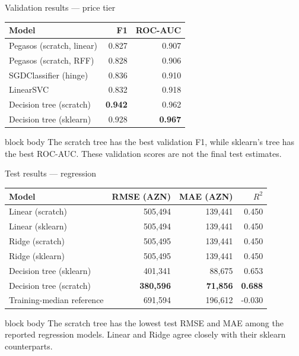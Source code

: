 \documentclass[aspectratio=169,10pt]{beamer}
\begin{document}
\begin{frame}{Validation results --- price tier}
  \centering
  \begin{tabular}{@{}lrr@{}}
    \toprule
    Model & F1 & ROC-AUC\\
    \midrule
    Pegasos (scratch, linear) & 0.827 & 0.907\\
    Pegasos (scratch, RFF) & 0.828 & 0.906\\
    SGDClassifier (hinge) & 0.836 & 0.910\\
    LinearSVC & 0.832 & 0.918\\
    Decision tree (scratch) & \textbf{0.942} & 0.962\\
    Decision tree (sklearn) & 0.928 & \textbf{0.967}\\
    \bottomrule
  \end{tabular}
  \vspace{0.45cm}\par
  \begin{beamercolorbox}[wd=0.86\linewidth,sep=0.65em,rounded=true]{block body}
    The scratch tree has the best validation F1, while sklearn's tree has the
    best ROC-AUC. These validation scores are not the final test estimates.
  \end{beamercolorbox}
\end{frame}

\begin{frame}{Test results --- regression}
  \centering
  \begin{tabular}{@{}lrrr@{}}
    \toprule
    Model & RMSE (AZN) & MAE (AZN) & $R^2$\\
    \midrule
    Linear (scratch) & 505,494 & 139,441 & 0.450\\
    Linear (sklearn) & 505,494 & 139,441 & 0.450\\
    Ridge (scratch) & 505,495 & 139,441 & 0.450\\
    Ridge (sklearn) & 505,495 & 139,441 & 0.450\\
    Decision tree (sklearn) & 401,341 & 88,675 & 0.653\\
    Decision tree (scratch) & \textbf{380,596} & \textbf{71,856} & \textbf{0.688}\\
    Training-median reference & 691,594 & 196,612 & -0.030\\
    \bottomrule
  \end{tabular}
  \vspace{0.45cm}\par
  \begin{beamercolorbox}[wd=0.86\linewidth,sep=0.65em,rounded=true]{block body}
    The scratch tree has the lowest test RMSE and MAE among the reported
    regression models. Linear and Ridge agree closely with their sklearn
    counterparts.
  \end{beamercolorbox}
\end{frame}
\end{document}
